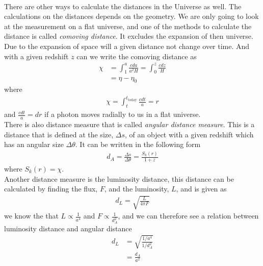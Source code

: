 \documentclass{article}
\begin{document}
\begin{multicols}{2}
\\
There are other ways to calculate the distances in the Universe as well. The calculations on the distances depends on the geometry.
 We are only going to look at the measurement on a flat universe, and one of the methods to calculate the distance is called \emph{comoving distance}. It excludes the expansion of then universe. Due to the expansion of space will a given distance not change over time. And with a given redshift $z$ can we write the comoving distance as
\begin{align}
    \chi &=\int_1^a\frac{cda}{a^2H}=\int_0^z\frac{cdz}{H}\\
    &=\eta-\eta_0
\end{align}
where
\begin{align}
    \chi=\int_t^{t_\text{today}}\frac{cdt}{a}=r
\end{align}
and $\frac{cdt}{a}=dr$ if a photon moves radially to us in a flat universe.
\\
There is also distance measure that is called \emph{angular distance measure}. This is a distance that is defined at the size, $\Delta s$, of an object with a given redshift which has an angular size $\Delta \theta$. It can be written in the following form
\begin{align}
    d_A=\frac{\Delta s}{\Delta \theta}=\frac{S_k(r)}{1+z}
\end{align}
where $S_k(r)=\chi$.\\
Another distance measure is the luminosity distance, this distance can be calculated by finding the flux, $F$, and the luminosity, $L$, and is given as
\begin{align}
    d_L=\sqrt{\frac{L}{4\pi F}}
\end{align}
we know the that $L\propto \frac{1}{a^4}$ and $F\propto\frac{1}{d_A^2}$, and we can therefore see a relation between luminosity distance and angular distance 
\begin{align}
    d_L&=\sqrt{\frac{1/a^4}{1/d_A^2}}\\
    &=\frac{d_A}{a^2}
\end{align}


\end{multicols}
\end{document}
